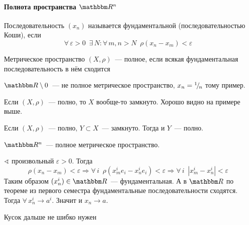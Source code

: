 \documentclass[12pt,timbord]{../../../notes}
\begin{document}
\paragraph{Полнота пространства \texorpdfstring{$\R^n$}{}}
\label{par:diffspace::banach}

\begin{defn}\label{defn:diffspace::banach::cauchyseq}
  Последовательность $(x_n)$ называется фундаментальной (последовательностью Коши),
  если 
  \[
    \forall\, \varepsilon > 0 \;\: \exists\, N\colon \forall\,m,n>N \;\: \rho(x_n - x_m) < \varepsilon 
  \]
\end{defn}

\begin{defn}\label{defn:diffspace::banach::comtmetspc}
  Метрическое пространство $(X,\rho)$~--- полное, если всякая фундаментальная последовательность
  в нём  сходится
\end{defn}

\begin{exmp*}
  $\R \setminus 0$~--- не полное метрическое пространство, $x_n = {}^{1}\!/_{\!n}$ тому пример.
\end{exmp*}

\begin{rem}\label{rem:diffspace::banach::clos}
  Если $(X, \rho)$~--- полно, то $X$ вообще-то замкнуто. Хорошо видно на примере выше.
\end{rem}
\begin{rem}\label{rem:diffspace::banach::closubset}
  Если $(X, \rho)$~--- полно, $Y \subset X$~--- замкнуто. Тогда и $Y$~--- полно.
\end{rem}

\begin{stat}\label{stat:diffspace::banach::comtRn}
  $\R^n$~--- полное метрическое пространство.
\end{stat}
\begin{itlproof}
  $\sphericalangle$ произвольный $\varepsilon > 0$. Тогда 
  \[
    \rho(x_n - x_m) < \varepsilon 
    \Rightarrow \forall\, i \;\: \rho(x_m^i e_i - x_n^i e_i) < \varepsilon
    \Rightarrow \forall\, i \;\: |x_m^i - x_n^i| < \varepsilon
  \]
  Таким образом $(x_n^i)\in \R$~--- фундаментальная. 
  А в $\R$ по теореме из первого семестра фундаментальные последовательности сходятся.
  Тогда $\forall\, x_n^i \to a^i$. Значит и $x_n \to a$. 
\end{itlproof}

Кусок дальше не шибко нужен
\end{document}
